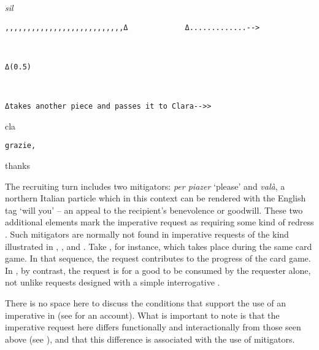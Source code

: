 \documentclass[output=paper,modfonts]{langscibook}
\begin{document}
%
\begin{mdframednoverticalspace}[style=secondfoc]
\begin{transbox}{8}{\textit{sil}}
\begin{verbatim}
,,,,,,,,,,,,,,,,,,,,,,,,,,,Δ             Δ.............-->
\end{verbatim}
\end{transbox}
\end{mdframednoverticalspace}
%
\begin{transbox}{9}{~}
\begin{verbatim}
Δ(0.5)              
\end{verbatim}
\end{transbox}
%
\begin{transbox}{10}{~}
\begin{verbatim}
Δtakes another piece and passes it to Clara-->>
\end{verbatim}
\end{transbox}\vspace{-2mm}
%
\begin{transbox}{11}{cla}
\begin{verbatim}
grazie,
\end{verbatim}
thanks
\end{transbox}\bigskip

The recruiting turn includes two mitigators: \textit{per piazer} ‘please’ and \textit{valà}, a northern Italian particle which in this context can be rendered with the English tag ‘will you’ -- an appeal to the recipient's benevolence or goodwill. These two additional elements mark the imperative request as requiring some kind of redress \citep{BrownLevinson1987}. Such mitigators are normally not found in imperative requests of the kind illustrated in , , and . Take , for instance, which takes place during the same card game. In that sequence, the request contributes to the progress of the card game. In , by contrast, the request is for a good to be consumed by the requester alone, not unlike requests designed with a simple interrogative . 

There is no space here to discuss the conditions that support the use of an imperative in  (see \citealt{Rossi2017} for an account). What is important to note is that the imperative request here differs functionally and interactionally from those seen above (see ), and that this difference is associated with the use of mitigators.\\
\end{document}
